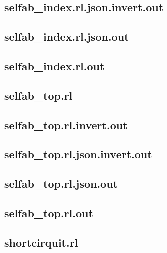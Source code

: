\subsection{selfab\_index.rl.json.invert.out}
\label{app:selfab_index_rl.json.invert.out}

\subsection{selfab\_index.rl.json.out}
\label{app:selfab_index_rl.json.out}

\subsection{selfab\_index.rl.out}
\label{app:selfab_index_rl.out}

\subsection{selfab\_top.rl}
\label{app:selfab_top_rl}

\subsection{selfab\_top.rl.invert.out}
\label{app:selfab_top_rl.invert.out}

\subsection{selfab\_top.rl.json.invert.out}
\label{app:selfab_top_rl.json.invert.out}

\subsection{selfab\_top.rl.json.out}
\label{app:selfab_top_rl.json.out}

\subsection{selfab\_top.rl.out}
\label{app:selfab_top_rl.out}

\subsection{shortcirquit.rl}
\label{app:shortcirquit_rl}

